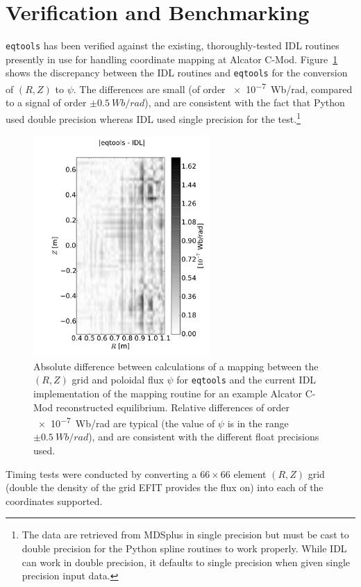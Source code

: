 \documentclass{elsarticle}
\newcommand{\eqtools}{\texttt{eqtools}\xspace}
\begin{document}
\section{Verification and Benchmarking}\label{sec:benchmark}
\eqtools has been verified against the existing, thoroughly-tested IDL routines presently in use for handling coordinate mapping at Alcator C-Mod.
Figure~\ref{fig:rz2psi_diff} shows the discrepancy between the IDL routines and \eqtools for the conversion of $(R, Z)$ to $\psi$.
The differences are small (of order \SI{e-7}{Wb/rad}, compared to a signal of order $\pm\SI{0.5}{Wb/rad}$), and are consistent with the fact that Python used double precision whereas IDL used single precision for the test.\footnote{The data are retrieved from MDSplus in single precision but must be cast to double precision for the Python spline routines to work properly. While IDL can work in double precision, it defaults to single precision when given single precision input data.}
\begin{figure}
	\centering
	\includegraphics[width=0.6\textwidth]{graphics/absolute_compare}
	\caption{Absolute difference between calculations of a mapping between the $(R, Z)$ grid and poloidal flux $\psi$ for \eqtools and the current IDL implementation of the mapping routine for an example Alcator C-Mod reconstructed equilibrium.  Relative differences of order \SI{e-7}{Wb/rad} are typical (the value of $\psi$ is in the range $\pm\SI{0.5}{Wb/rad}$), and are consistent with the different float precisions used.}
	\label{fig:rz2psi_diff}
\end{figure}
Timing tests were conducted by converting a $66\times66$ element $(R, Z)$ grid (double the density of the grid EFIT provides the flux on) into each of the coordinates supported.
\end{document}
